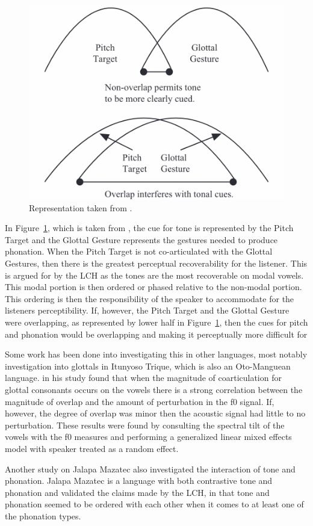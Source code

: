 \documentclass[12pt, letterpaper]{article}
\begin{document}
\begin{figure}[!ht]
	\centering
	\includegraphics[width=.5\textwidth]{../Gestures.png}
	\caption{Representation taken from \citet{dicanioCoarticulationToneGlottal2012}.}
	\label{fig:GlottalGestures}
\end{figure}
In Figure~\ref{fig:GlottalGestures}, which is taken from \citet{dicanioCoarticulationToneGlottal2012}, the cue for tone is represented by the Pitch Target and the Glottal Gesture represents the gestures needed to produce phonation. When the Pitch Target is not co-articulated with the Glottal Gestures, then there is the greatest perceptual recoverability for the listener. This is argued for by the LCH as the tones are the most recoverable on modal vowels. This modal portion is then ordered or phased relative to the non-modal portion. This ordering is then the responsibility of the speaker to accommodate for the listeners perceptibility. If, however, the Pitch Target and the Glottal Gesture were overlapping, as represented by lower half in Figure~\ref{fig:GlottalGestures}, then the cues for pitch and phonation would be overlapping and making it perceptually more difficult for 

Some work has been done into investigating this in other languages, most notably  investigation into glottals in Itunyoso Trique, which is also an Oto-Manguean language. \citeauthor{dicanioCoarticulationToneGlottal2012} in his study found that when the magnitude of coarticulation for glottal consonants occurs on the vowels there is a strong correlation between the magnitude of overlap and the amount of perturbation in the f0 signal. If, however, the degree of overlap was minor then the acoustic signal had little to no perturbation. These results were found by consulting the spectral tilt of the vowels with the f0 measures and performing a generalized linear mixed effects model with speaker treated as a random effect. 

Another study on Jalapa Mazatec \citep{garellekAcousticConsequencesPhonation2011} also investigated the interaction of tone and phonation. Jalapa Mazatec is a language with both contrastive tone and phonation and \citet{garellekAcousticConsequencesPhonation2011} validated the claims made by the LCH, in that tone and phonation seemed to be ordered with each other when it comes to at least one of the phonation types.
\end{document}
